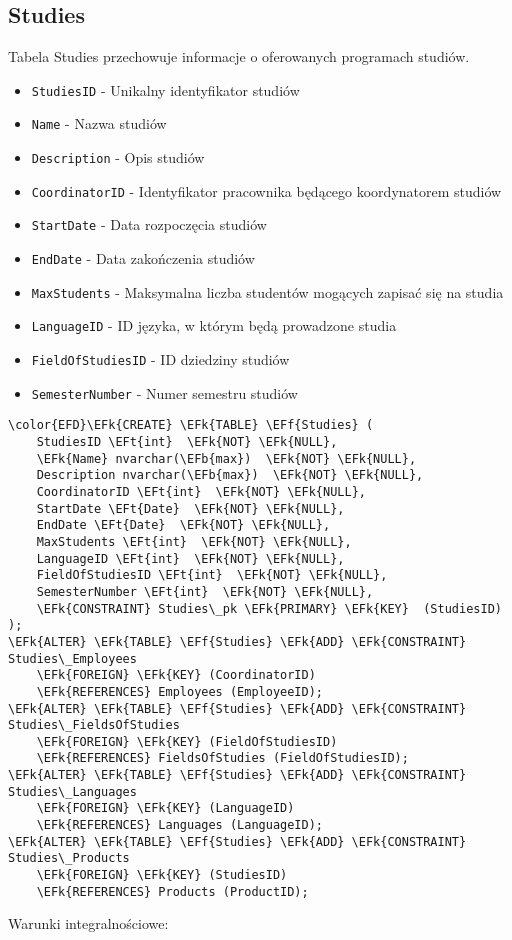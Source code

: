 \documentclass[11pt]{article}
\newcommand{\EFk}[1]{\textcolor{EFk}{\textbf{#1}}} %
\newcommand{\EFb}[1]{\textcolor{EFb}{\textbf{#1}}} %
\newcommand{\EFf}[1]{\textcolor{EFf}{#1}} %
\newcommand{\EFt}[1]{\textcolor{EFt}{\textbf{#1}}} %
\begin{document}
\subsection{Studies}
\label{sec:org9000340}
Tabela Studies przechowuje informacje o oferowanych programach studiów.
\begin{itemize}
\item \texttt{StudiesID} - Unikalny identyfikator studiów
\item \texttt{Name} - Nazwa studiów
\item \texttt{Description} - Opis studiów
\item \texttt{CoordinatorID} - Identyfikator pracownika będącego koordynatorem studiów
\item \texttt{StartDate} - Data rozpoczęcia studiów
\item \texttt{EndDate} - Data zakończenia studiów
\item \texttt{MaxStudents} - Maksymalna liczba studentów mogących zapisać się na studia
\item \texttt{LanguageID} - ID języka, w którym będą prowadzone studia
\item \texttt{FieldOfStudiesID} - ID dziedziny studiów
\item \texttt{SemesterNumber} - Numer semestru studiów
\end{itemize}
\begin{Code}
\begin{Verbatim}
\color{EFD}\EFk{CREATE} \EFk{TABLE} \EFf{Studies} (
    StudiesID \EFt{int}  \EFk{NOT} \EFk{NULL},
    \EFk{Name} nvarchar(\EFb{max})  \EFk{NOT} \EFk{NULL},
    Description nvarchar(\EFb{max})  \EFk{NOT} \EFk{NULL},
    CoordinatorID \EFt{int}  \EFk{NOT} \EFk{NULL},
    StartDate \EFt{Date}  \EFk{NOT} \EFk{NULL},
    EndDate \EFt{Date}  \EFk{NOT} \EFk{NULL},
    MaxStudents \EFt{int}  \EFk{NOT} \EFk{NULL},
    LanguageID \EFt{int}  \EFk{NOT} \EFk{NULL},
    FieldOfStudiesID \EFt{int}  \EFk{NOT} \EFk{NULL},
    SemesterNumber \EFt{int}  \EFk{NOT} \EFk{NULL},
    \EFk{CONSTRAINT} Studies\_pk \EFk{PRIMARY} \EFk{KEY}  (StudiesID)
);
\EFk{ALTER} \EFk{TABLE} \EFf{Studies} \EFk{ADD} \EFk{CONSTRAINT} Studies\_Employees
    \EFk{FOREIGN} \EFk{KEY} (CoordinatorID)
    \EFk{REFERENCES} Employees (EmployeeID);
\EFk{ALTER} \EFk{TABLE} \EFf{Studies} \EFk{ADD} \EFk{CONSTRAINT} Studies\_FieldsOfStudies
    \EFk{FOREIGN} \EFk{KEY} (FieldOfStudiesID)
    \EFk{REFERENCES} FieldsOfStudies (FieldOfStudiesID);
\EFk{ALTER} \EFk{TABLE} \EFf{Studies} \EFk{ADD} \EFk{CONSTRAINT} Studies\_Languages
    \EFk{FOREIGN} \EFk{KEY} (LanguageID)
    \EFk{REFERENCES} Languages (LanguageID);
\EFk{ALTER} \EFk{TABLE} \EFf{Studies} \EFk{ADD} \EFk{CONSTRAINT} Studies\_Products
    \EFk{FOREIGN} \EFk{KEY} (StudiesID)
    \EFk{REFERENCES} Products (ProductID);
\end{Verbatim}
\end{Code}
Warunki integralnościowe:
\end{document}
